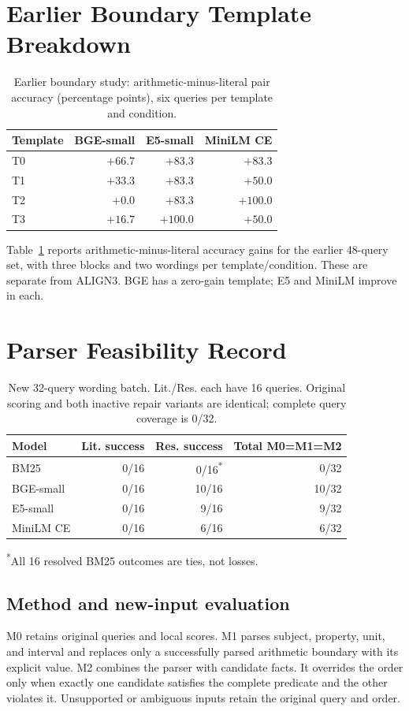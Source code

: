 \documentclass[conference,letterpaper]{IEEEtran}
\begin{document}
\section{Earlier Boundary Template Breakdown}\label{app:templates}
\begin{table}[t]
\caption{Earlier boundary study: arithmetic-minus-literal pair accuracy (percentage points), six queries per template and condition.}
\label{tab:templates}
\centering\footnotesize
\begin{tabular}{lrrr}
\toprule
Template & BGE-small & E5-small & MiniLM CE \\
\midrule
T0 & $+66.7$ & $+83.3$ & $+83.3$ \\
T1 & $+33.3$ & $+83.3$ & $+50.0$ \\
T2 & $+0.0$ & $+83.3$ & $+100.0$ \\
T3 & $+16.7$ & $+100.0$ & $+50.0$ \\
\bottomrule
\end{tabular}
\end{table}
Table~\ref{tab:templates} reports arithmetic-minus-literal accuracy gains for the earlier 48-query set, with three blocks and two wordings per template/condition. These are separate from ALIGN3. BGE has a zero-gain template; E5 and MiniLM improve in each.


\section{Parser Feasibility Record}\label{app:parser}
\begin{table}[t]
\caption{New 32-query wording batch. Lit./Res. each have 16 queries. Original scoring and both inactive repair variants are identical; complete query coverage is 0/32.}
\label{tab:parser}
\centering\footnotesize
\begin{tabular}{lrrr}
\toprule
Model & Lit. success & Res. success & Total M0=M1=M2 \\
\midrule
BM25 & 0/16 & 0/16\textsuperscript{*} & 0/32 \\
BGE-small & 0/16 & 10/16 & 10/32 \\
E5-small & 0/16 & 9/16 & 9/32 \\
MiniLM CE & 0/16 & 6/16 & 6/32 \\
\bottomrule
\end{tabular}
\par\smallskip\footnotesize\textsuperscript{*}All 16 resolved BM25 outcomes are ties, not losses.
\end{table}
\subsection{Method and new-input evaluation}
M0 retains original queries and local scores. M1 parses subject, property, unit, and interval and replaces only a successfully parsed arithmetic boundary with its explicit value. M2 combines the parser with candidate facts. It overrides the order only when exactly one candidate satisfies the complete predicate and the other violates it. Unsupported or ambiguous inputs retain the original query and order.
\end{document}
